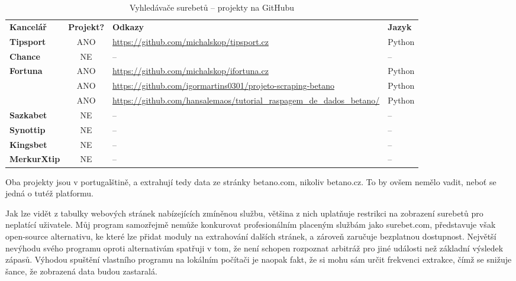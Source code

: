 \documentclass[11pt,a4paper,twoside,openright]{report}
\newcommand\yes{ANO}
\newcommand\no{NE}
\newcommand\nothing{--}
\begin{document}
\begin{table}[h]
\begin{center}
\begin{tabularx}{\textwidth}{ | >{\raggedright\arraybackslash}m{6em}|| c | X | l | } 
\hline
\multicolumn{4}{|c|}{\rule{0pt}{15pt} \large \textbf{Vyhledávače surebetů – projekty na GitHubu}} \\ [1ex] 
\hline
    \textbf{Kancelář} & \textbf{Projekt?} & \textbf{Odkazy} & \textbf{Jazyk} \\
    \hline 
    \textbf{Tipsport} & \yes & \url{https://github.com/michalskop/tipsport.cz} & Python \\ 
    \hline
    \textbf{Chance} & \no & \nothing & \nothing \\ 
    \hline
    \textbf{Fortuna} & \yes & \url{https://github.com/michalskop/ifortuna.cz} & Python \\ 
    \hline
    \multirow{2}{5em}{\textbf{Betano}*} & \yes & \url{https://github.com/igormartins0301/projeto-scraping-betano} & Python \\ 
                                       & \yes & \url{https://github.com/hansalemaos/tutorial_raspagem_de_dados_betano/} & Python \\ 
    \hline
    \textbf{Sazkabet} & \no & \nothing & \nothing \\ 
    \hline
    \textbf{Synottip} & \no & \nothing & \nothing \\ 
    \hline
    \textbf{Kingsbet} & \no & \nothing & \nothing \\ 
    \hline
    \textbf{MerkurXtip} & \no & \nothing & \nothing \\ 
  \hline
\end{tabularx}
\caption{Vyhledávače surebetů – projekty na GitHubu}
\begin{flushleft}
\footnotesize * Oba projekty jsou v portugalštině, a extrahují tedy data ze stránky betano.com, nikoliv betano.cz. To by ovšem nemělo vadit, neboť se jedná o tutéž platformu. 
\end{flushleft}
\end{center}
\end{table}

Jak lze vidět z tabulky webových stránek nabízejících zmíněnou službu, většina z nich uplatňuje restrikci na zobrazení surebetů pro neplatící uživatele. Můj program samozřejmě nemůže konkurovat profesionálním placeným službám jako surebet.com, představuje však open-source alternativu, ke které lze přidat moduly na extrahování dalších stránek, a zároveň zaručuje bezplatnou dostupnost. Největší nevýhodu svého programu oproti alternativám spatřuji v tom, že není schopen rozpoznat arbitráž pro jiné události než základní výsledek zápasů. Výhodou spuštění vlastního programu na lokálním počítači je naopak fakt, že si mohu sám určit frekvenci extrakce, čímž se snižuje šance, že zobrazená data budou zastaralá. \\
\end{document}

